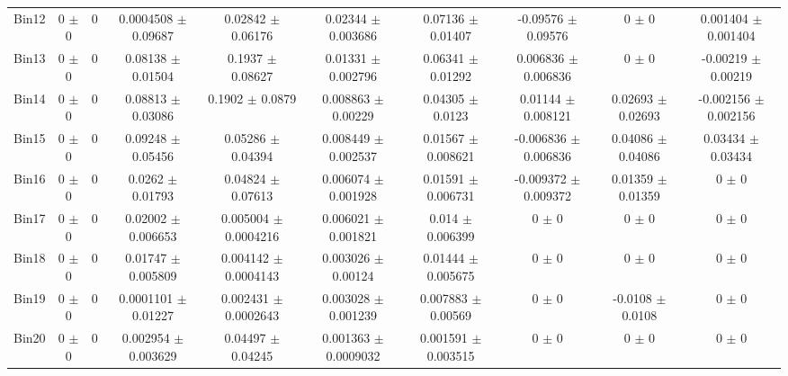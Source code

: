 \begin{tabular}{@{\extracolsep{4pt}}lccccccccc@{}}
     Bin12 & 0 $\pm$ 0 & 0 & 0.0004508 $\pm$ 0.09687 & 0.02842 $\pm$ 0.06176 & 0.02344 $\pm$ 0.003686 & 0.07136 $\pm$ 0.01407 & -0.09576 $\pm$ 0.09576 & 0 $\pm$ 0 & 0.001404 $\pm$ 0.001404 \\ 
     Bin13 & 0 $\pm$ 0 & 0 & 0.08138 $\pm$ 0.01504 & 0.1937 $\pm$ 0.08627 & 0.01331 $\pm$ 0.002796 & 0.06341 $\pm$ 0.01292 & 0.006836 $\pm$ 0.006836 & 0 $\pm$ 0 & -0.00219 $\pm$ 0.00219 \\ 
     Bin14 & 0 $\pm$ 0 & 0 & 0.08813 $\pm$ 0.03086 & 0.1902 $\pm$ 0.0879 & 0.008863 $\pm$ 0.00229 & 0.04305 $\pm$ 0.0123 & 0.01144 $\pm$ 0.008121 & 0.02693 $\pm$ 0.02693 & -0.002156 $\pm$ 0.002156 \\ 
     Bin15 & 0 $\pm$ 0 & 0 & 0.09248 $\pm$ 0.05456 & 0.05286 $\pm$ 0.04394 & 0.008449 $\pm$ 0.002537 & 0.01567 $\pm$ 0.008621 & -0.006836 $\pm$ 0.006836 & 0.04086 $\pm$ 0.04086 & 0.03434 $\pm$ 0.03434 \\ 
     Bin16 & 0 $\pm$ 0 & 0 & 0.0262 $\pm$ 0.01793 & 0.04824 $\pm$ 0.07613 & 0.006074 $\pm$ 0.001928 & 0.01591 $\pm$ 0.006731 & -0.009372 $\pm$ 0.009372 & 0.01359 $\pm$ 0.01359 & 0 $\pm$ 0 \\ 
     Bin17 & 0 $\pm$ 0 & 0 & 0.02002 $\pm$ 0.006653 & 0.005004 $\pm$ 0.0004216 & 0.006021 $\pm$ 0.001821 & 0.014 $\pm$ 0.006399 & 0 $\pm$ 0 & 0 $\pm$ 0 & 0 $\pm$ 0 \\ 
     Bin18 & 0 $\pm$ 0 & 0 & 0.01747 $\pm$ 0.005809 & 0.004142 $\pm$ 0.0004143 & 0.003026 $\pm$ 0.00124 & 0.01444 $\pm$ 0.005675 & 0 $\pm$ 0 & 0 $\pm$ 0 & 0 $\pm$ 0 \\ 
     Bin19 & 0 $\pm$ 0 & 0 & 0.0001101 $\pm$ 0.01227 & 0.002431 $\pm$ 0.0002643 & 0.003028 $\pm$ 0.001239 & 0.007883 $\pm$ 0.00569 & 0 $\pm$ 0 & -0.0108 $\pm$ 0.0108 & 0 $\pm$ 0 \\ 
     Bin20 & 0 $\pm$ 0 & 0 & 0.002954 $\pm$ 0.003629 & 0.04497 $\pm$ 0.04245 & 0.001363 $\pm$ 0.0009032 & 0.001591 $\pm$ 0.003515 & 0 $\pm$ 0 & 0 $\pm$ 0 & 0 $\pm$ 0 \\ 
\hline\hline
  \end{tabular}
